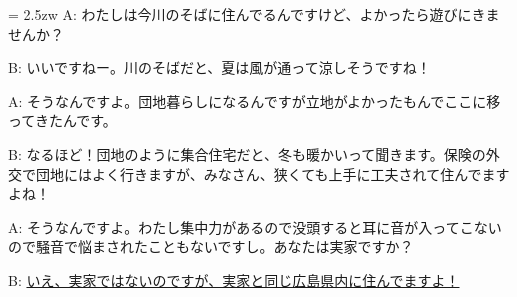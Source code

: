 \documentclass[11pt]{amsart}
\title{}
\author{}
\newenvironment{hangall}[1]{\hangindent = 2.5zw\everypar{\hangindent = 2.5zw}}{}
\begin{document}
\maketitle
\begin{hangall}{}%
A: わたしは今川のそばに住んでるんですけど、よかったら遊びにきませんか？

B: いいですねー。川のそばだと、夏は風が通って涼しそうですね！

A: そうなんですよ。団地暮らしになるんですが立地がよかったもんでここに移ってきたんです。

B: なるほど！団地のように集合住宅だと、冬も暖かいって聞きます。保険の外交で団地にはよく行きますが、みなさん、狭くても上手に工夫されて住んでますよね！

A: そうなんですよ。わたし集中力があるので没頭すると耳に音が入ってこないので騒音で悩まされたこともないですし。あなたは実家ですか？

B: \ul{いえ、実家ではないのですが、実家と同じ広島県内に住んでますよ！}\end{hangall}
\end{document}

